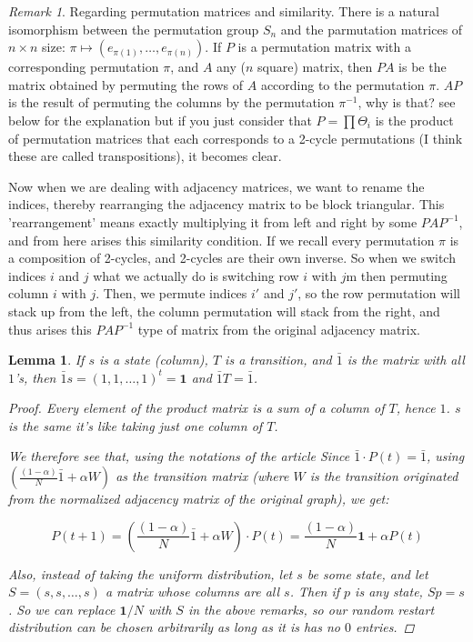 \documentclass[a4paper,10pt]{article}
\theoremstyle{definition}
\theoremstyle{remark}
\newtheorem{remark}{Remark}
\theoremstyle{plain}
\newtheorem{lemma}{Lemma}[section]
\begin{document}
\begin{remark}
\label{remark:permutations}
Regarding permutation matrices and similarity.
There is a natural isomorphism between the permutation group $S_n$ and the
parmutation matrices of $n\times n$ size: 
$\pi \mapsto (e_{\pi(1)},\dots, e_{\pi(n)})$. If $P$ is a permutation matrix
with a corresponding permutation $\pi$, 
and $A$ any ($n$ square) matrix, then $PA$ is be the matrix obtained by
permuting the rows of $A$ according to the permutation $\pi$. $AP$ is the result
of permuting the columns by the permutation $\pi^{-1}$, why is that? see below
for the explanation but if you just consider that $P = \prod \Theta_i$ is the
product of permutation matrices that each corresponds to a 2-cycle permutations
(I think these are called transpositions), it becomes clear.

Now when we are dealing with adjacency matrices, we want to rename the indices,
thereby rearranging the adjacency matrix to be block triangular. This
'rearrangement' means exactly multiplying it from left and right by some
$PAP^{-1}$, and from here arises this similarity condition. If we recall every
permutation $\pi$ is a composition of 2-cycles, and 2-cycles are their own
inverse. So when we switch indices $i$ and $j$ what we actually do is switching
row $i$ with $j$m then permuting column $i$ with $j$. Then, we permute indices
$i'$ and $j'$, so the row permutation will stack up from the left, the column
permutation will stack from the right, and thus arises this $PAP^{-1}$ type of
matrix from the original adjacency matrix.
\end{remark}

\begin{lemma}
\label{theonelemma}
If $s$ is a state (column), $T$ is a transition, and $\bar{1}$ is the matrix with all $1$'s,
then $\bar{1}s = (1,1,\dots,1)^t = \mathbf{1}$ and $\bar{1}T = \bar{1}$.
\begin{proof}
Every element of the product matrix is a sum of a column of $T$, hence $1$.
$s$ is the same it's like taking just one column of $T$.

We therefore see that, using the notations of the article
\parencite{cowen2017network}
Since $\bar{1} \cdot P(t) = \bar{1}$, using 
$(\frac{(1-\alpha)}{N}\bar{1} + \alpha W)$ as the transition matrix (where $W$
is the transition originated from the normalized adjacency matrix of the
original graph), we get:

$$
P(t+1) = (\frac{(1-\alpha)}{N}\bar{1} + \alpha W) \cdot P(t) = 
\frac{(1-\alpha)}{N}\mathbf{1} + \alpha P(t)
$$

Also, instead of taking the uniform distribution, let $s$ be some state, and let
$S = (s,s,\dots,s)$ a matrix whose columns are all $s$. Then if $p$ is any
state, $Sp = s$. So we can replace $\mathbf{1}/N$ with $S$ in the above
remarks, so our random restart distribution can be chosen arbitrarily as long as
it is has no $0$ entries.

\end{proof}
\end{lemma}
\end{document}
